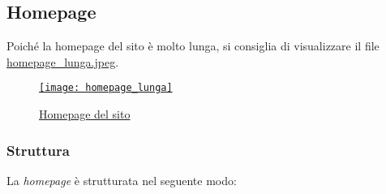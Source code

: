 \subsection{Homepage}
\label{sub:homepage}
Poiché la homepage del sito è molto lunga, si consiglia di visualizzare il file \href{pic/homepage_lunga.jpeg}{\underline{homepage\_lunga.jpeg}}.
\begin{figure}[h]
\centering
\href{pic/homepage_lunga.jpeg}{\texttt{[image: homepage\_lunga]}}
\caption{\href{pic/homepage_lunga.jpeg}{Homepage del sito}} %
\end{figure}

\subsubsection{Struttura}
\label{sub:home-struttura}
La \emph{homepage} è strutturata nel seguente modo:
